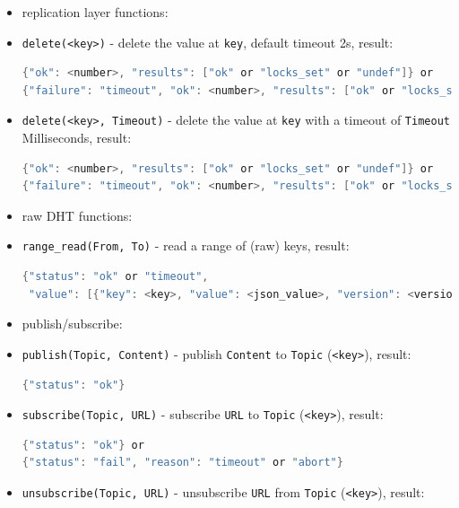 \documentclass[a4paper]{scrreprt}
\newcommand{\code}[1]{\lstinline[basicstyle=\ttfamily]!#1!}
\begin{document}
\begin{itemize}
\begin{lstlisting}[language=java]
{"tlog": <tlog>,
 "results": [{"status": "ok"} or {"status": "ok", "value": <json_value>} or
             {"status": "fail", "reason": "timeout" or "abort" or "not_found"}]}
\end{lstlisting}
  \item[] \hspace{-1.7em}replication layer functions:
  \item \code{delete(<key>)} - delete the value at \code{key}, default timeout 2s, result:
\begin{lstlisting}[language=java]
{"ok": <number>, "results": ["ok" or "locks_set" or "undef"]} or
{"failure": "timeout", "ok": <number>, "results": ["ok" or "locks_set" or "undef"]}
\end{lstlisting}
  \item \code{delete(<key>, Timeout)} - delete the value at \code{key} with a timeout of \code{Timeout} Milliseconds, result:
\begin{lstlisting}[language=java]
{"ok": <number>, "results": ["ok" or "locks_set" or "undef"]} or
{"failure": "timeout", "ok": <number>, "results": ["ok" or "locks_set" or "undef"]}
\end{lstlisting}
  \item[] \hspace{-1.7em}raw DHT functions:
  \item \code{range_read(From, To)} - read a range of (raw) keys, result:
\begin{lstlisting}[language=java]
{"status": "ok" or "timeout",
 "value": [{"key": <key>, "value": <json_value>, "version": <version>}]}
\end{lstlisting}
  \item[] \hspace{-1.7em}publish/subscribe:
  \item \code{publish(Topic, Content)} - publish \code{Content} to \code{Topic} (\code{<key>}), result:
\begin{lstlisting}[language=java]
{"status": "ok"}
\end{lstlisting}
  \item \code{subscribe(Topic, URL)} - subscribe \code{URL} to \code{Topic} (\code{<key>}), result:
\begin{lstlisting}[language=java]
{"status": "ok"} or
{"status": "fail", "reason": "timeout" or "abort"}
\end{lstlisting}
  \item \code{unsubscribe(Topic, URL)} - unsubscribe \code{URL} from \code{Topic} (\code{<key>}), result:

\end{itemize}
\end{document}
